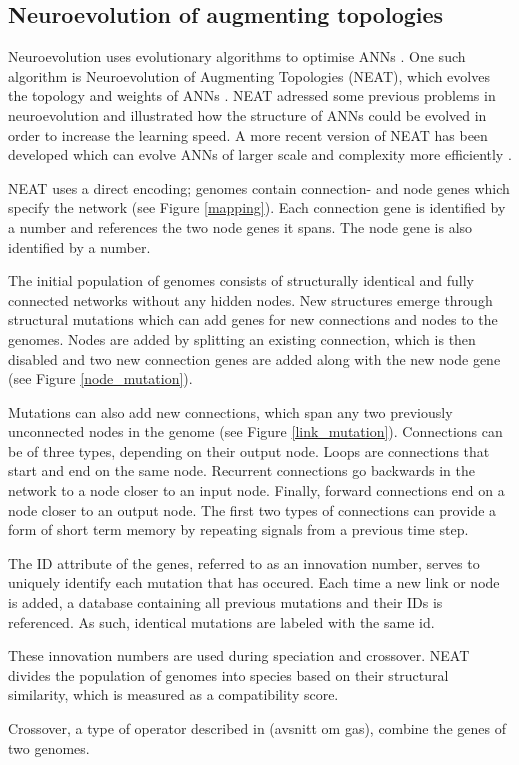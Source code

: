 \newpage

\subsection{Neuroevolution of augmenting topologies}
Neuroevolution uses evolutionary algorithms to optimise ANNs \cite{neuroevolution_review}.
One such algorithm is Neuroevolution of Augmenting Topologies (NEAT), which evolves the topology and weights of ANNs
\cite{neat_main, neat_short, neat_phd}.
NEAT adressed some previous problems in neuroevolution and illustrated how the structure of ANNs could be
evolved in order to increase the learning speed. A more recent version of NEAT has been developed which can evolve ANNs of larger scale and
complexity more efficiently \cite{hyper_neat}.

NEAT uses a direct encoding; genomes contain connection- and node genes which specify the network (see Figure \ref{mapping}). Each connection gene is identified
by a number and references the two node genes it spans. The node gene is also identified by a number.



The initial population of genomes consists of structurally identical and fully connected networks without any hidden nodes.
New structures emerge through structural mutations which can add genes for new connections and nodes to the genomes.
Nodes are added by splitting an existing connection, which is then disabled and two new connection genes are added along
with the new node gene (see Figure \ref{node_mutation}).



Mutations can also add new connections, which span any two previously unconnected nodes in the genome (see Figure \ref{link_mutation}).
Connections can be of three types, depending on their output node. Loops are connections that start and end on the same node. Recurrent
connections go backwards in the network to a node closer to an input node. Finally, forward connections end on a node closer to an output
node. The first two types of connections can provide a form of short term memory by repeating signals from a previous time step.



The ID attribute of the genes, referred to as an innovation number, serves to uniquely identify each mutation that has occured.
Each time a new link or node is added, a database containing all previous mutations and their IDs is referenced.
As such, identical mutations are labeled with the same id.

These innovation numbers are used during speciation and crossover. NEAT divides the population of genomes into species based on their structural
similarity, which is measured as a compatibility score.

Crossover, a type of operator described in (avsnitt om gas), combine the genes of two genomes.



